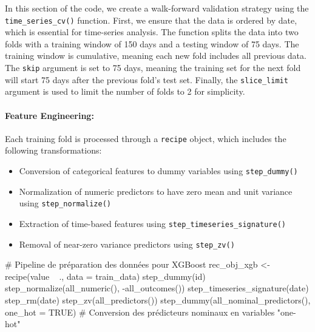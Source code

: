 \documentclass[12pt]{report}
\begin{document}
In this section of the code, we create a walk-forward validation strategy using the \texttt{time\_series\_cv()} function. First, we ensure that the data is ordered by date, which is essential for time-series analysis. The function splits the data into two folds with a training window of 150 days and a testing window of 75 days. The training window is cumulative, meaning each new fold includes all previous data. The \texttt{skip} argument is set to 75 days, meaning the training set for the next fold will start 75 days after the previous fold's test set. Finally, the \texttt{slice\_limit} argument is used to limit the number of folds to 2 for simplicity.

\paragraph{Feature Engineering:}
Each training fold is processed through a \texttt{recipe} object, which includes the following transformations:

\begin{itemize}
    \item Conversion of categorical features to dummy variables using \texttt{step\_dummy()}
    \item Normalization of numeric predictors to have zero mean and unit variance using \texttt{step\_normalize()}
    \item Extraction of time-based features using \texttt{step\_timeseries\_signature()}
    \item Removal of near-zero variance predictors using \texttt{step\_zv()}
\end{itemize}

\begin{code}
# Pipeline de préparation des données pour XGBoost
rec_obj_xgb <- recipe(value ~ ., data = train_data) %
  step_dummy(id) %
  step_normalize(all_numeric(), -all_outcomes()) %
  step_timeseries_signature(date) %
  step_rm(date) %
  step_zv(all_predictors()) %
  step_dummy(all_nominal_predictors(), one_hot = TRUE)  # Conversion des prédicteurs nominaux en variables "one-hot"
\end{code}\\
\end{document}
